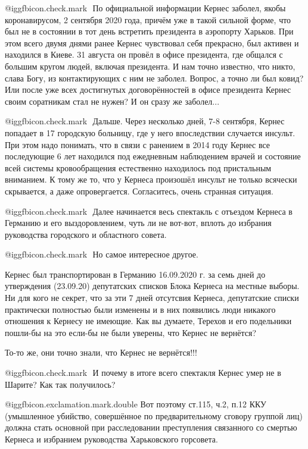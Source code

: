 \begin{itemize}
 @igg{fbicon.check.mark} ️  По официальной информации Кернес заболел, якобы коронавирусом, 2 сентября
2020 года, причём уже в такой сильной форме, что был не в состоянии в тот день
встретить президента в аэропорту Харьков. При этом всего двумя днями ранее
Кернес чувствовал себя прекрасно, был активен и находился в Киеве. 31 августа
он провёл в офисе президента, где общался с большим кругом людей, включая
президента. И нам точно известно, что никто, слава Богу, из контактирующих с
ним не заболел. Вопрос, а точно ли был ковид? Или после уже всех достигнутых
договорённостей в офисе президента Кернес своим соратникам стал не нужен? И он
сразу же заболел...

 @igg{fbicon.check.mark} ️  Дальше. Через несколько дней, 7-8 сентября, Кернес попадает в 17 городскую
больницу, где у него впоследствии случается инсульт. При этом надо понимать,
что в связи с ранением в 2014 году Кернес все последующие 6 лет находился под
ежедневным наблюдением врачей и состояние всей системы кровообращения
естественно находилось под пристальным вниманием. К тому же то, что у Кернеса
произошёл инсульт не только всячески скрывается, а даже опровергается.
Согласитесь, очень странная ситуация.

 @igg{fbicon.check.mark} ️  Далее начинается весь спектакль с отъездом Кернеса в Германию и его
выздоровлением, чуть ли не вот-вот, вплоть до избрания руководства городского и
областного совета.

 @igg{fbicon.check.mark} ️  Но самое интересное другое.

Кернес был транспортирован в Германию 16.09.2020 г. за семь дней до утверждения
(23.09.20) депутатских списков Блока Кернеса на местные выборы. Ни для кого не
секрет, что за эти 7 дней отсутсвия Кернеса, депутатские списки практически
полностью были изменены и в них появились люди никакого отношения к Кернесу не
имеющие. Как вы думаете, Терехов и его подельники пошли-бы на это если-бы не
были уверены, что Кернес не вернётся?

То-то же, они точно знали, что Кернес не вернётся!!!

 @igg{fbicon.check.mark} ️  И почему в итоге всего спектакля Кернес умер не в Шарите? Как так получилось?

@igg{fbicon.exclamation.mark.double} Вот поэтому ст.115, ч.2, п.12 ККУ (умышленное убийство, совершённое по
предварительному сговору группой лиц) должна стать основной при расследовании
преступления связанного со смертью Кернеса и избранием руководства Харьковского
горсовета.


\end{itemize}
